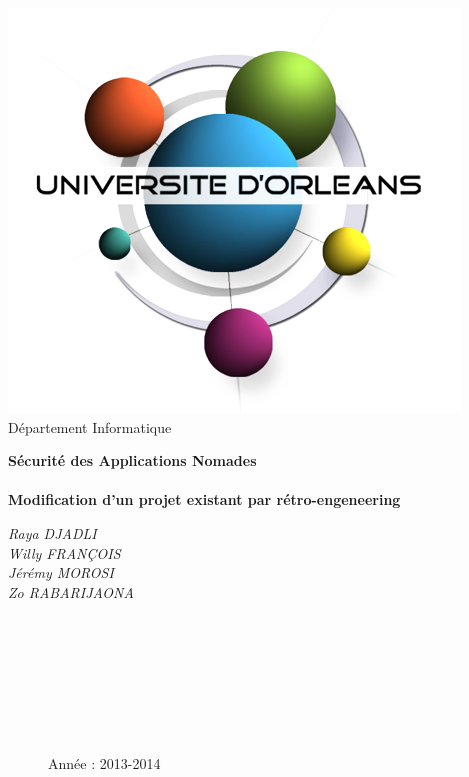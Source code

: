 \documentclass[12pt,a4paper,oneside]{article}
\begin{document}
\begin{titlepage}
\begin{flushright}
           \includegraphics[scale=0.30]{../images/univorleans.png}\\ 
                      Département Informatique
\end{flushright}
\vspace{20mm}
\begin{center}
\textbf{\huge{Sécurité des Applications Nomades}\\ ~\\ Modification d'un projet existant par rétro-engeneering}\\
\vspace{20mm}
\begin{large}
	\textit{Raya DJADLI}\\
	\textit{Willy FRANÇOIS}\\
	\textit{Jérémy MOROSI}\\
	\textit{Zo RABARIJAONA}
\end{large}

\end{center}
\begin{figure}[b!]
\begin{flushright}
~~\\ ~~\\ ~~\\ ~~\\ ~~\\ ~~\\ ~~\\
\large{Année : 2013-2014}
\end{flushright}
\end{figure}
\end{titlepage}
\end{document}
